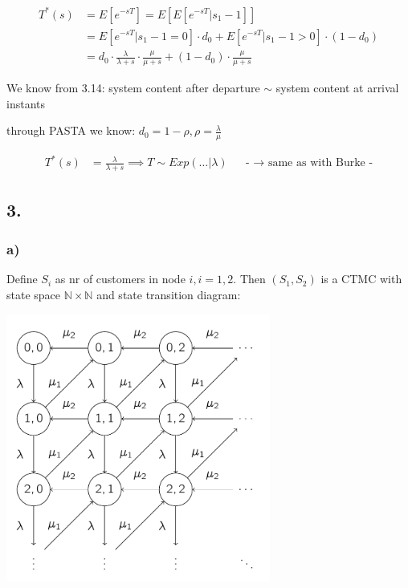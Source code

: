 \begin{align*}
T^{\ast}\left(s\right)&=E\left[e^{{-sT}}\right]=E\left[E\left[e^{{-sT}}|s_{1}-1\right]\right]\\
&=E\left[e^{{-sT}}|s_{1}-1=0\right]\cdot d_{0}+E\left[e^{{-sT}}|s_{1}-1> 0\right]\cdot \left(1-d_{0}\right)\\
&=d_{0}\cdot \frac{\lambda }{\lambda +s}\cdot \frac{\mu }{\mu +s}+\left(1-d_{0}\right)\cdot \frac{\mu }{\mu +s}
\end{align*}

We know from 3.14: system content after departure $\sim $ system content at arrival instants

through PASTA we know: $d_{0}=1-\rho ,\rho =\frac{\lambda }{\mu }$

\begin{align*}
T^{{\ast }}\left(s\right)&=\frac{\lambda }{\lambda +s}\implies T\sim Exp \left(\ldots |\lambda \right)&& \text{-  $\rightarrow$ same as with Burke -}
\end{align*}

\subsection*{3.}

\subsubsection*{a)}

Define $S_i$ as nr of customers in node $i, i=1,2$. Then $(S_1, S_2)$ is a CTMC with state space $\mathbb{N} \times \mathbb{N}$ and state transition diagram:

\includegraphics[width=0.65\textwidth]{pics/state_trans_que_nets_3.png}


